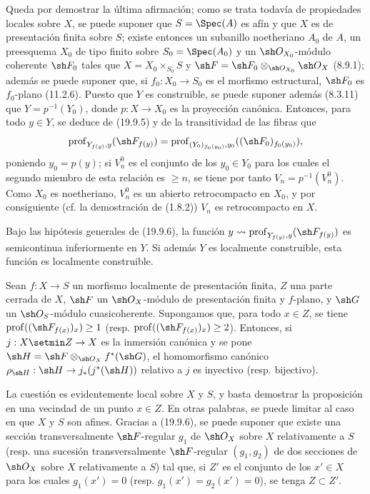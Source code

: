 Queda por demostrar la última afirmación; como se trata todavía de propiedades
locales sobre $X$, se puede suponer que $S=\Spec(A)$ es afín y que $X$ es de
presentación finita sobre $S$; existe entonces un subanillo noetheriano $A_0$
de $A$, un preesquema $X_0$ de tipo finito sobre $S_0=\Spec(A_0)$ y un
$\sh O_{X_0}$-módulo coherente $\sh F_0$ tales que
$X=X_0\times_{S_0}S$ y
$\sh F=\sh F_0\otimes_{\sh O_{X_0}}\sh O_X$ (8.9.1); además se puede suponer
que, si $f_0:X_0\to S_0$ es el morfismo estructural, $\sh F_0$ es
$f_0$-plano (11.2.6). Puesto que $Y$ es construible, se puede suponer además
(8.3.11) 
que $Y=p^{-1}(Y_0)$, donde $p:X\to X_0$ es la proyección canónica.
Entonces, para todo $y\in Y$, se deduce de (19.9.5) y de la transitividad de
las fibras que
\[
  \operatorname{prof}_{Y_{f(y)},y}(\sh F_{f(y)})
  =\operatorname{prof}_{(Y_0)_{f_0(y_0)},y_0}((\sh F_0)_{f_0(y_0)}),
\]
poniendo $y_0=p(y)$; si $V_n^0$ es el conjunto de los $y_0\in Y_0$ para los
cuales el segundo miembro de esta relación es $\geq n$, se tiene por tanto
$V_n=p^{-1}(V_n^0)$. Como $X_0$ es noetheriano, $V_n^0$ es un abierto
retrocompacto en $X_0$, y por consiguiente (cf. la demostración de (1.8.2))
$V_n$ es retrocompacto en $X$.



\begin{corollary}[19.9.7]
\label{IV.19.9.7}
Bajo las hipótesis generales de \textup{(19.9.6)}, la función
$y\leadsto\operatorname{prof}_{Y_{f(y)},y}(\sh F_{f(y)})$ es semicontinua
inferiormente en $Y$. Si además $Y$ es localmente construible, esta función
es localmente construible.
\end{corollary}

\begin{proposition}[19.9.8]
\label{IV.19.9.8}
Sean $f:X\to S$ un morfismo localmente de presentación finita, $Z$ una parte
cerrada de $X$, $\sh F$ un $\sh O_X$-módulo de presentación finita y
$f$-plano, y $\sh G$ un $\sh O_S$-módulo cuasicoherente. Supongamos que, para
todo $x\in Z$, se tiene
$\operatorname{prof}((\sh F_{f(x)})_x)\geq1$
\textup{(resp. $\operatorname{prof}((\sh F_{f(x)})_x)\geq2$)}. Entonces, si
$j:X\setmin Z\to X$ es la inmersión canónica y se pone
$\sh H=\sh F\otimes_{\sh O_X}f^*(\sh G)$, el homomorfismo canónico
$\rho_{\sh H}:\sh H\to j_*(j^*(\sh H))$ relativo a $j$ es inyectivo \textup{(resp.}
bijectivo\textup{)}.
\end{proposition}

La cuestión es evidentemente local sobre $X$ y $S$, y basta demostrar la
proposición en una vecindad de un punto $x\in Z$. En otras palabras, se puede
limitar al caso en que $X$ y $S$ son afines. Gracias a (19.9.6), se puede
suponer que existe una sección transversalmente $\sh F$-regular $g_1$ de
$\sh O_X$ sobre $X$ relativamente a $S$ (resp. una sucesión transversalmente
$\sh F$-regular $(g_1,g_2)$ de dos secciones de $\sh O_X$ sobre $X$ relativamente
a $S$) tal que, si $Z'$ es el conjunto de los $x'\in X$ para los cuales
$g_1(x')=0$ (resp. $g_1(x')=g_2(x')=0$), se tenga $Z\subset Z'$.

